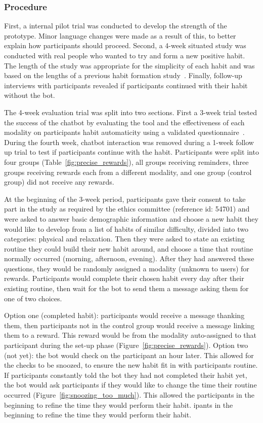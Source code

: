 \subsubsection{Procedure}
First, a internal pilot trial was conducted to develop the strength of the prototype. Minor language changes were made as a result of this, to better explain how participants should proceed. Second, a  4-week situated study was conducted with real people who wanted to try and form a new positive habit. The length of the study was appropriate for the simplicity of each habit and was based on the lengths of a previous habit formation study~\cite{article_beyond_self_tracking_designing_apps}. Finally, follow-up interviews with participants revealed if participants continued with their habit without the bot.

The 4-week evaluation trial was split into two sections. First a 3-week trial tested the success of the chatbot by evaluating the tool and the effectiveness of each modality on participants habit automaticity using a validated questionnaire~\cite{article_4q_SRBAI}. During the fourth week, chatbot interaction was removed during a 1-week follow up trial to test if participants continue with the habit. Participants were split into four groups (Table~\ref{fig:precise_rewards}), all groups receiving reminders, three groups receiving rewards each from a different modality, and one group (control group) did not receive any rewards.

At the beginning of the 3-week period, participants gave their consent to take part in the study as required by the ethics committee (reference id: 54701) and were asked to answer basic demographic information and choose a new habit they would like to develop from a list of habits of similar difficulty, divided into two categories: physical and relaxation. Then they were asked to state an existing routine they could build their new habit around, and choose a time that routine normally occurred (morning, afternoon, evening). After they had answered these questions, they would be randomly assigned a modality (unknown to users) for rewards. Participants would complete their chosen habit every day after their existing routine, then wait for the bot to send them a message asking them for one of two choices.

Option one (completed habit): participants would receive a message thanking them, then participants not in the control group would receive a message linking them to a reward. This reward would be from the modality auto-assigned to that participant during the set-up phase (Figure~\ref{fig:precise_rewards}). Option two (not yet): the bot would check on the participant an hour later. This allowed for the checks to be snoozed, to ensure the new habit fit in with participants routine. If participants constantly told the bot they had not completed their habit yet, the bot would ask participants if they would like to change the time their routine occurred (Figure~\ref{fig:snoozing_too_much}). This allowed the participants in the beginning to refine the time they would perform their habit.
ipants in the beginning to refine the time they would perform their habit.


